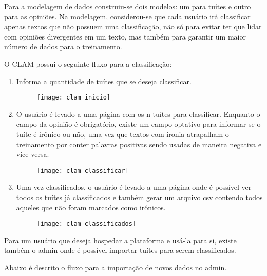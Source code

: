 Para a modelagem de dados construiu-se dois modelos: um para tuítes e outro para
as opiniões.
Na modelagem, considerou-se que cada usuário irá classificar apenas textos que não 
possuem uma classificação, não só para evitar ter que lidar com opiniões divergentes em um texto,
mas também para garantir um maior número de dados para o treinamento. 

O CLAM possui o seguinte fluxo para a classificação:

\begin{enumerate}
	\item Informa a quantidade de tuítes que se deseja classificar.
	\begin{figure}[H]
		\texttt{[image: clam\_inicio]}
	\end{figure}
	\item O usuário é levado a uma página com os n tuítes para classificar.
	Enquanto o campo da opinião é obrigatório, existe um campo optativo para informar
	se o tuíte é irônico ou não, uma vez que textos com ironia atrapalham
	o treinamento por conter palavras positivas sendo usadas de maneira negativa e vice-versa.
	\begin{figure}[H]
		\texttt{[image: clam\_classificar]}
	\end{figure}
	\item Uma vez classificados, o usuário é levado a uma página onde é possível ver todos
	os tuítes já classificados e também gerar um arquivo csv contendo todos aqueles
	que não foram marcados como irônicos.
	\begin{figure}[H]
		\texttt{[image: clam\_classificados]}
	\end{figure}
\end{enumerate}

Para um usuário que deseja hospedar a plataforma e usá-la para si, existe também o admin onde
é possível importar tuítes para serem classificados.

Abaixo é descrito o fluxo para a importação de novos dados no admin.

